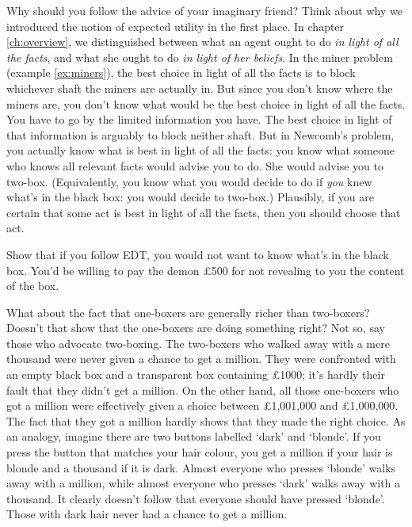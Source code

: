 Why should you follow the advice of your imaginary friend? Think about
why we introduced the notion of expected utility in the first place.
In chapter \ref{ch:overview}, we distinguished between what an agent
ought to do \emph{in light of all the facts}, and what she ought to do
\emph{in light of her beliefs}. In the miner problem (example
\ref{ex:miners}), the best choice in light of all the facts is to
block whichever shaft the miners are actually in. But since you don't
know where the miners are, you don't know what would be the best
choice in light of all the facts. You have to go by the limited
information you have. The best choice in light of that information is
arguably to block neither shaft. But in Newcomb's problem, you
actually know what is best in light of all the facts: you know what
someone who knows all relevant facts would advise you to do. She would
advise you to two-box. (Equivalently, you know what you would decide
to do if \emph{you} knew what's in the black box: you would decide to
two-box.) Plausibly, if you are certain that some act is best in light
of all the facts, then you should choose that act.

\begin{exercise2}
  Show that if you follow EDT, you would not want to know what's in
  the black box. You'd be willing to pay the demon £500 for not
  revealing to you the content of the box. 
\end{exercise2}

What about the fact that one-boxers are generally richer than
two-boxers? Doesn't that show that the one-boxers are doing something
right? Not so, say those who advocate two-boxing. The two-boxers who
walked away with a mere thousand were never given a chance to get a
million. They were confronted with an empty black box and a transparent
box containing £1000; it's hardly their fault that they didn't get a
million. On the other hand, all those one-boxers who got a million
were effectively given a choice between £1,001,000 and £1,000,000. The
fact that they got a million hardly shows that they made the right
choice. As an analogy, imagine there are two buttons labelled `dark'
and `blonde'. If you press the button that matches your hair colour,
you get a million if your hair is blonde and a thousand if it is
dark. Almost everyone who presses `blonde' walks away with a million,
while almost everyone who presses `dark' walks away with a
thousand. It clearly doesn't follow that everyone should have pressed
`blonde'. Those with dark hair never had a chance to get a million.

